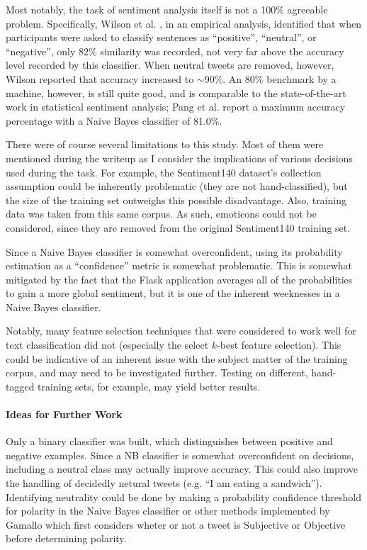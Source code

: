 \documentclass[letter,12pt]{article}
\begin{document}
Most notably, the task of sentiment analysis itself is
not a 100\% agreeable problem.  Specifically, Wilson et al. \cite{wilson05}, in
an empirical analysis, identified that when participants were asked to classify
sentences as ``positive'', ``neutral'', or ``negative'', only 82\% similarity
was recorded, not very far above the accuracy level recorded by this
classifier. When neutral tweets are removed, however, Wilson reported that
accuracy increased to $\sim$90\%. An $80\%$ benchmark by a machine, however, is
still quite good, and is comparable to the state-of-the-art work in statistical
sentiment analysis; Pang et al. \cite{pang02} report a maximum accuracy
percentage with a Naive Bayes classifier of 81.0\%.

There were of course several limitations to this study. Most of them were
mentioned during the writeup as I consider the implications of various
decisions used during the task. For example, the Sentiment140 dataset's
collection assumption could be inherently problematic (they are not
hand-classified), but the size of the training set outweighs this possible
disadvantage. Also, training data was taken from this same corpus. As such,
emoticons could not be considered, since they are removed from the original
Sentiment140 training set.

Since a Naive Bayes classifier is somewhat overconfident, using its probability
estimation as a ``confidence'' metric is somewhat problematic. This is somewhat
mitigated by the fact that the Flask application averages all of the
probabilities to gain a more global sentiment, but it is one of the inherent
weeknesses in a Naive Bayes classifier.

Notably, many feature selection techniques that were considered to work well
for text classification did not (especially the select $k$-best feature
selection). This could be indicative of an inherent issue with the subject
matter of the training corpus, and may need to be investigated further. Testing
on different, hand-tagged training sets, for example, may yield better results.

\paragraph{Ideas for Further Work}

Only a binary classifier was built, which distinguishes between positive and
negative examples. Since a NB classifier is somewhat overconfident on
decisions, including a neutral class may actually improve accuracy. This could
also improve the handling of decidedly netural tweets (e.g. ``I am eating a
sandwich''). Identifying neutrality could be done by making a probability
confidence threshold for polarity in the Naive Bayes classifier or other
methods implemented by Gamallo \cite{gamallo14} which first considers wheter or
not a tweet is Subjective or Objective before determining polarity.
\end{document}
